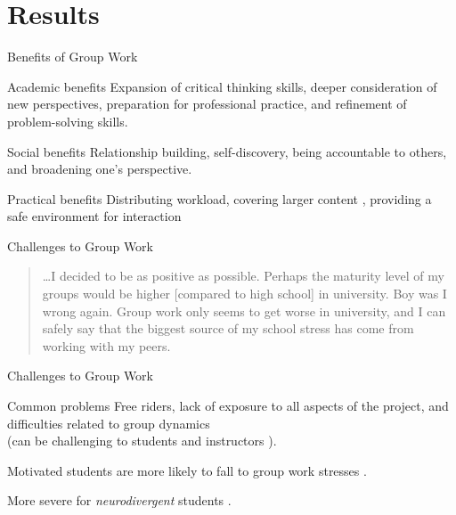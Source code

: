 \documentclass[12pt,table]{beamer}
\begin{document}
\section{Results}

\begin{frame}{Benefits of Group Work \cite{lee2015, concordia}}
        \begin{alertblock}{Academic benefits}
        \small Expansion of critical thinking skills, deeper consideration of new perspectives, preparation for professional practice, and refinement of problem-solving skills.
        \end{alertblock}
        \begin{alertblock}{Social benefits}
        \small Relationship building, self-discovery, being accountable to others, and broadening one's perspective.
        \end{alertblock}
        \begin{alertblock}{Practical benefits}
        \small Distributing workload, covering larger content%
        ,  providing a safe environment for interaction%
    \end{alertblock}
\end{frame}

\begin{frame}{Challenges to Group Work}
\begin{quote}
    \dots I decided to be as positive as possible. Perhaps the maturity level of my groups would be higher [compared to high school] in university. Boy was I wrong again. Group work only seems to get worse in university, and I can safely say that the biggest source of my school stress has come from working with my peers. \cite{macleans}
\end{quote}
\end{frame}

\begin{frame}{Challenges to Group Work}
    \begin{alertblock}{Common problems}
        Free riders, lack of exposure to all aspects of the project, and difficulties related to group dynamics \cite{chapman2006}\\(can be challenging to students and instructors \cite{facultyfocus2}).
    \end{alertblock}
    
    Motivated students are more likely to fall to group work stresses \cite{lee2015}.
    
    More severe for \emph{neurodivergent} students \cite{helping}.
\end{frame}
\end{document}
